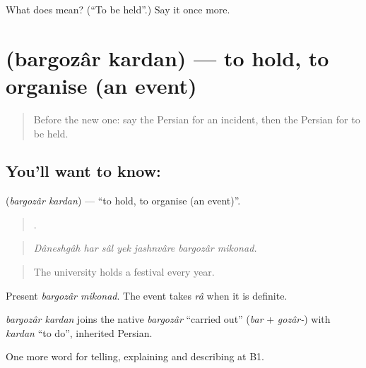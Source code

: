 \begin{tcolorbox}[breakable,colback=teal!4,colframe=teal!35!black,title={Before you move on}]
What does   mean? (\textquotedblleft{}To be held\textquotedblright{}.) Say it once more.
\end{tcolorbox}
\section[\texorpdfstring{\fa{برگزار} \fa{کردن} (bargozâr kardan)}{برگزار کردن (bargozâr kardan)}]{  (bargozâr kardan) — to hold, to organise (an event)}

\label{lesson:FA-C314-bargozar-kardan}



\begin{quote}
Before the new one: say the Persian for an incident, then the Persian for to be held.
\end{quote}

\subsection*{You'll want to know:  }
\textbf{ } (\emph{bargozâr kardan}) — \textquotedblleft{}to hold, to organise (an event)\textquotedblright{}.

\begin{quote}
      .
\end{quote}

\begin{quote}
\emph{Dâneshgâh har sâl yek jashnvâre bargozâr mikonad.}
\end{quote}

\begin{quote}
The university holds a festival every year.
\end{quote}

Present \emph{bargozâr mikonad}. The event takes \emph{râ} when it is definite.

\begin{cousinweb}
\emph{bargozâr kardan} joins the native \emph{bargozâr} \textquotedblleft{}carried out\textquotedblright{} (\emph{bar} + \emph{gozâr-}) with \emph{kardan} \textquotedblleft{}to do\textquotedblright{}, inherited Persian.
\end{cousinweb}

\begin{grammarlens}[title={What you've built}]
One more word for telling, explaining and describing at B1.
\end{grammarlens}

